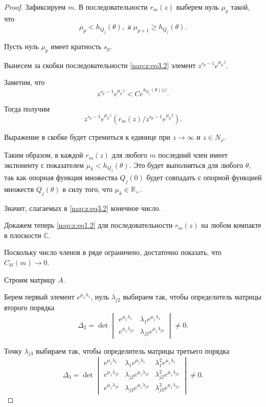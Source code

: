 \begin{proof}
Зафиксируем $m$. В последовательности $r_m(z)$ выберем нуль $\mu_p$ такой, что \[\mu_p<h_{Q_j}(\theta), \text{ а } \mu_{p+1}\geq h_{Q_j}(\theta).\] 

Пусть нуль $\mu_p$ имеет кратность $s_p$. 

Вынесем за скобки последовательности \eqref{nap:z:eq3.2} элемент $z^{s_p-1}e^{\mu_pz}$. 

Заметим, что $$z^{s_p-1}e^{\mu_pz}<Ce^{h_{Q_j}(\theta)|z|}.$$ 

Тогда получим $$z^{s_p-1}e^{\mu_pz}(r_m(z)/z^{s_p-1}e^{\mu_pz}).$$ 

Выражение в скобке будет стремиться к единице при $z\to \infty $ и $z\in N_{\varphi}$. 

Таким образом, в каждой $r_m(z)$ для любого $m$ последний член имеет экспоненту с показателем $\mu_k< h_{Q_j}(\theta)$. Это будет выполняться для любого $\theta$, так как опорная функция множества $Q_j(0)$ будет совпадать с опорной функцией множеств $Q_j(\theta)$ в силу того, что $\mu_k\in \mathbb R_+$. 

Значит, слагаемых в \eqref{nap:z:eq3.2} конечное число. 



Докажем теперь \eqref{nap:z:eq1.2} для последовательности $r_m(z)$ на любом компакте в плоскости $\mathbb C$. 

Поскольку число членов в ряде ограничено, достаточно показать, что $C_{kl}(m)\to 0$.  



Строим матрицу $A$. 

Берем первый элемент $e^{\mu_1\lambda_1}$, нуль $\lambda_{j2}$ выбираем так, чтобы определитель матрицы второго порядка \[\Delta_2=\det \begin{vmatrix} e^{\mu_1\lambda_1} & \lambda_1 e^{\mu_1\lambda_1} \\ e^{\mu_1\lambda_{j2}} & \lambda_{j2} e^{\mu_1\lambda_{j2}} \end{vmatrix} \neq 0.\]

Точку $\lambda_{j3}$ выбираем так, чтобы определитель матрицы третьего порядка  \[ \Delta_3=\det \begin{vmatrix}  e^{\mu_1\lambda_1} & \lambda_1  e^{\mu_1\lambda_1}  & \lambda_1^2  e^{\mu_1\lambda_1} \\ e^{\mu_1\lambda_{j2}} & \lambda_{j2} e^{\mu_1\lambda_{j2}} & \lambda_{j2}^2 e^{\mu_1\lambda_{j2}} \\ e^{\mu_1\lambda_{j3}} & \lambda_{j3} e^{\mu_1\lambda_{j3}} & \lambda_{j3}^2 e^{\mu_1\lambda_{j3}} \end{vmatrix} \neq 0.\]


\end{proof}
